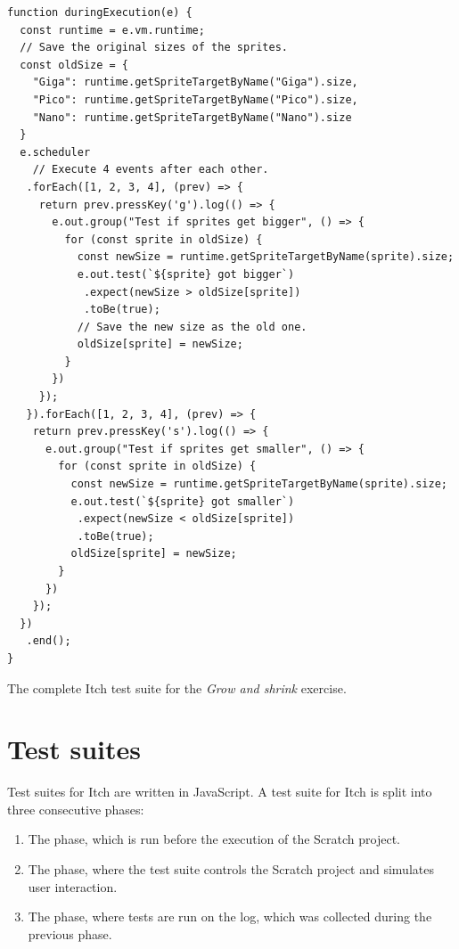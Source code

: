 \documentclass[../main]{subfiles}
\begin{document}
\begin{listing}
    \begin{verbatim}
function duringExecution(e) {
  const runtime = e.vm.runtime;
  // Save the original sizes of the sprites.
  const oldSize = {
    "Giga": runtime.getSpriteTargetByName("Giga").size,
    "Pico": runtime.getSpriteTargetByName("Pico").size,
    "Nano": runtime.getSpriteTargetByName("Nano").size
  }
  e.scheduler
    // Execute 4 events after each other.
   .forEach([1, 2, 3, 4], (prev) => {
     return prev.pressKey('g').log(() => {
       e.out.group("Test if sprites get bigger", () => {
         for (const sprite in oldSize) {
           const newSize = runtime.getSpriteTargetByName(sprite).size;
           e.out.test(`${sprite} got bigger`)
            .expect(newSize > oldSize[sprite])
            .toBe(true);
           // Save the new size as the old one.
           oldSize[sprite] = newSize;
         }
       })
     });
   }).forEach([1, 2, 3, 4], (prev) => {
    return prev.pressKey('s').log(() => {
      e.out.group("Test if sprites get smaller", () => {
        for (const sprite in oldSize) {
          const newSize = runtime.getSpriteTargetByName(sprite).size;
          e.out.test(`${sprite} got smaller`)
           .expect(newSize < oldSize[sprite])
           .toBe(true);
          oldSize[sprite] = newSize;
        }
      })
    });
  })
   .end();
}
    \end{verbatim}
    \caption{The complete Itch test suite for the \emph{Grow and shrink} exercise.}
    \label{lst:grow-and-shrink-during}
\end{listing}

\section{Test suites}\label{sec:itch-test-suites}

Test suites for Itch are written in JavaScript.
A test suite for Itch is split into three consecutive phases:

\begin{enumerate}
    \item The  phase, which is run before the execution of the Scratch project.
    \item The  phase, where the test suite controls the Scratch project and simulates user interaction.
    \item The  phase, where tests are run on the log, which was collected during the previous phase.
\end{enumerate}
\end{document}
